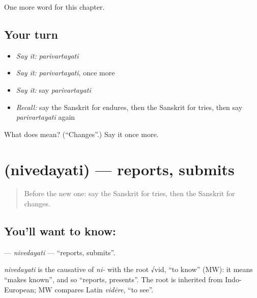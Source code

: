 \begin{grammarlens}[title={What you've built}]
One more word for this chapter.
\end{grammarlens}

\subsection*{Your turn}
\begin{itemize}
\raggedright
  \item \emph{Say it:} \emph{parivartayati}
  \item \emph{Say it:} \emph{parivartayati}, once more
  \item \emph{Say it:} say \emph{parivartayati}
  \item \emph{Recall:} say the Sanskrit for endures, then the Sanskrit for tries, then say \emph{parivartayati} again
\end{itemize}

\begin{tcolorbox}[breakable,colback=teal!4,colframe=teal!35!black,title={Before you move on}]
What does  mean? (\textquotedblleft{}Changes\textquotedblright{}.) Say it once more.
\end{tcolorbox}
\section[\texorpdfstring{\sk{निवेदयति} (nivedayati)}{निवेदयति (nivedayati)}]{ (nivedayati) — reports, submits}

\label{lesson:SA-C176-nivedayati}



\begin{quote}
Before the new one: say the Sanskrit for tries, then the Sanskrit for changes.
\end{quote}

\subsection*{You'll want to know: }
\textbf{} — \emph{nivedayati} — \textquotedblleft{}reports, submits\textquotedblright{}.

\begin{cousinweb}
\emph{nivedayati} is the causative of \emph{ni-} with the root √vid, \textquotedblleft{}to know\textquotedblright{} (MW): it means \textquotedblleft{}makes known\textquotedblright{}, and so \textquotedblleft{}reports, presents\textquotedblright{}. The root is inherited from Indo-European; MW compares Latin \emph{vidēre}, \textquotedblleft{}to see\textquotedblright{}.
\end{cousinweb}

